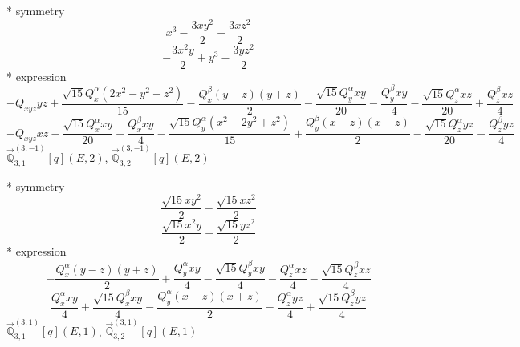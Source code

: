 \documentclass[fleqn,8pt]{jsarticle}
\begin{document}
\noindent\quad ** symmetry
\begin{dmath*}
x^{3} - \frac{3 x y^{2}}{2} - \frac{3 x z^{2}}{2}
\end{dmath*}
\begin{dmath*}
- \frac{3 x^{2} y}{2} + y^{3} - \frac{3 y z^{2}}{2}
\end{dmath*}
\noindent\quad ** expression
\begin{dmath*}
- Q_{xyz} y z + \frac{\sqrt{15} Q_{x}^{\alpha} \left(2 x^{2} - y^{2} - z^{2}\right)}{15} - \frac{Q_{x}^{\beta} \left(y - z\right) \left(y + z\right)}{2} - \frac{\sqrt{15} Q_{y}^{\alpha} x y}{20} - \frac{Q_{y}^{\beta} x y}{4} - \frac{\sqrt{15} Q_{z}^{\alpha} x z}{20} + \frac{Q_{z}^{\beta} x z}{4}
\end{dmath*}
\begin{dmath*}
- Q_{xyz} x z - \frac{\sqrt{15} Q_{x}^{\alpha} x y}{20} + \frac{Q_{x}^{\beta} x y}{4} - \frac{\sqrt{15} Q_{y}^{\alpha} \left(x^{2} - 2 y^{2} + z^{2}\right)}{15} + \frac{Q_{y}^{\beta} \left(x - z\right) \left(x + z\right)}{2} - \frac{\sqrt{15} Q_{z}^{\alpha} y z}{20} - \frac{Q_{z}^{\beta} y z}{4}
\end{dmath*}
\noindent\quad $\vec{\mathbb{Q}}_{3,1}^{(3,-1)}[q](E,2)$, $\vec{\mathbb{Q}}_{3,2}^{(3,-1)}[q](E,2)$

\noindent\quad ** symmetry
\begin{dmath*}
\frac{\sqrt{15} x y^{2}}{2} - \frac{\sqrt{15} x z^{2}}{2}
\end{dmath*}
\begin{dmath*}
\frac{\sqrt{15} x^{2} y}{2} - \frac{\sqrt{15} y z^{2}}{2}
\end{dmath*}
\noindent\quad ** expression
\begin{dmath*}
- \frac{Q_{x}^{\alpha} \left(y - z\right) \left(y + z\right)}{2} + \frac{Q_{y}^{\alpha} x y}{4} - \frac{\sqrt{15} Q_{y}^{\beta} x y}{4} - \frac{Q_{z}^{\alpha} x z}{4} - \frac{\sqrt{15} Q_{z}^{\beta} x z}{4}
\end{dmath*}
\begin{dmath*}
\frac{Q_{x}^{\alpha} x y}{4} + \frac{\sqrt{15} Q_{x}^{\beta} x y}{4} - \frac{Q_{y}^{\alpha} \left(x - z\right) \left(x + z\right)}{2} - \frac{Q_{z}^{\alpha} y z}{4} + \frac{\sqrt{15} Q_{z}^{\beta} y z}{4}
\end{dmath*}
\noindent\quad $\vec{\mathbb{Q}}_{3,1}^{(3,1)}[q](E,1)$, $\vec{\mathbb{Q}}_{3,2}^{(3,1)}[q](E,1)$
\end{document}
